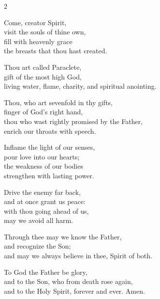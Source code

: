\begin{multicols}{2}
\raggedcolumns
\begin{enpars}
Come, creator Spirit,\\
visit the souls of thine own,\\
fill with heavenly grace\\
the breasts that thou hast created.

Thou art called Paraclete,\\
gift of the most high God,\\
living water, flame, charity, and spiritual anointing.

Thou, who art sevenfold in thy gifts,\\
finger of God's right hand,\\
thou who wast rightly promised by the Father,\\
enrich our throats with speech.

Inflame the light of our senses,\\
pour love into our hearts;\\
the weakness of our bodies\\
strengthen with lasting power.

Drive the enemy far back,\\
and at once grant us peace:\\
with thou going ahead of us,\\
may we avoid all harm.

Through thee may we know the Father,\\
and recognize the Son;\\
and may we always believe in thee, Spirit of both.

To God the Father be glory,\\
and to the Son, who from death rose again,\\
and to the Holy Spirit, forever and ever. Amen.

\end{enpars}
\end{multicols}